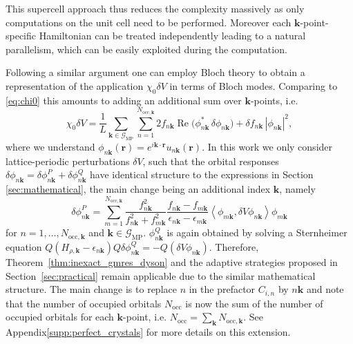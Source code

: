 \documentclass[hidelinks,onefignum,onetabnum]{siamart250211}
\newcommand{\Real}{\operatorname{Re}}
\newcommand{\Nocc}{N_{\mathrm{occ}}}
\newcommand{\Nocck}{N_{\mathrm{occ},\bm{k}}}
\newcommand{\mpgrid}{\mathcal{G}_\text{MP}}
\newcommand{\braket}[2]{\left\langle #1, #2 \right\rangle}
\newcommand{\supplement}{Appendix\xspace}
\newcommand{\supplement}{Supplementary Material\xspace}
\begin{document}
This supercell approach thus reduces the complexity massively
as only computations on the unit cell need to be performed.
Moreover each $\bm k$-point-specific Hamiltonian can be treated independently
leading to a natural parallelism, which can be easily exploited during the computation.
%
%

Following a similar argument one can employ Bloch theory to obtain a representation
of the application $\chi_0 \delta V$ in terms of Bloch modes.
Comparing to \eqref{eq:chi0} this amounts to adding an additional sum over $\bm k$-points, i.e.
\begin{equation}
    \label{eq:bzchi0}
  \chi_0 \delta V
  = \frac1L \sum_{\bm k \in \mpgrid} \sum_{n=1}^{\Nocck} 2 f_{n\bm k} \Real \big( \phi_{n\bm k}^* \, \delta \phi_{n\bm k} \big) + \delta f_{n\bm k} \, \left| \phi_{n \bm k} \right|^2,
\end{equation}
where we understand $\phi_{n\bm k}(\bm r) = e^{i \bm k \cdot \bm r} u_{n\bm k}(\bm r)$.
In this work we only consider lattice-periodic perturbations $\delta V$,
such that the orbital responses $\delta \phi_{n\bm k} = \delta \phi^P_{n\bm k} + \delta \phi^Q_{n\bm k}$
have identical structure to the expressions in Section \ref{sec:mathematical},
the main change being an additional index $\bm k$, namely
\begin{equation}
    \delta \phi_{n\bm k}^P = \sum_{m=1}^{\Nocck}
    \frac{f_{n\bm k}^2}{f_{n\bm k}^2 + f_{m\bm k}^2} \frac{f_{n\bm k} - f_{m\bm k}}{\epsilon_{n\bm k} - \epsilon_{m\bm k}} \braket{\phi_{m\bm k}}{\delta V \phi_{n\bm k}} \phi_{m\bm k}
\end{equation}
%
for $n = 1,\ldots,\Nocck$ and $\bm k \in \mpgrid$. $\phi_{n\bm k}^Q$ is again obtained by solving a Sternheimer equation
%
    $Q \left( H_{\rho,\bm k} - \epsilon_{n\bm k} \right) Q \delta \phi_{n\bm k}^Q = -Q \left(\delta V \phi_{n\bm k}\right)$.
%
Therefore, Theorem~\ref{thm:inexact_gmres_dyson} and the adaptive strategies proposed
in Section~\ref{sec:practical} remain applicable due to the similar mathematical structure.
The main change is to replace $n$ in the prefactor $C_{i,n}$ by $n\bm k$ 
and note that the number of occupied orbitals $\Nocc$ is now the sum of the number of occupied orbitals
for each $\bm k$-point, i.e. $\Nocc = \sum_{\bm k} \Nocck$.
See \supplement \ref{supp:perfect_crystals} for more details on this extension.

%
%
%
%
\end{document}
